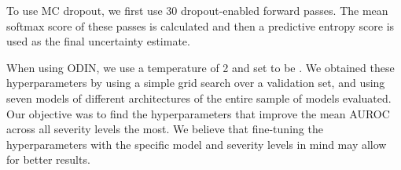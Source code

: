 \documentclass[table]{article} \usepackage{PRIMEarxiv}
\begin{document}
To use MC dropout, we first use 30 dropout-enabled forward passes. 
The mean softmax score of these passes is calculated and then a predictive entropy score is used as the final uncertainty estimate.

When using ODIN, we use a temperature of 2 and set  to be . We obtained these hyperparameters by using a simple grid search over a validation set, and using seven models of different architectures of the entire sample of models evaluated. Our objective was to find the hyperparameters that improve the mean AUROC across all severity levels the most.
We believe that fine-tuning the hyperparameters with the specific model and severity levels in mind may allow for better results.
\end{document}
